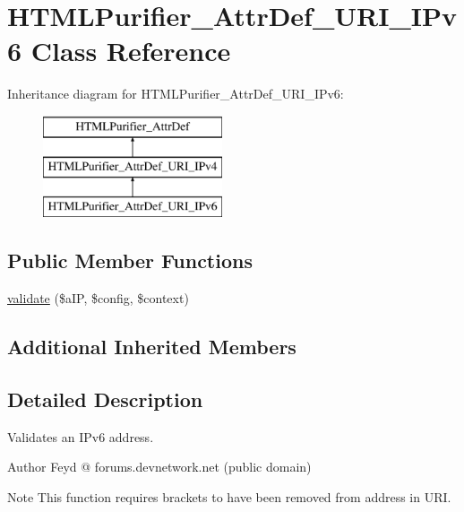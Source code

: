 \hypertarget{classHTMLPurifier__AttrDef__URI__IPv6}{\section{H\+T\+M\+L\+Purifier\+\_\+\+Attr\+Def\+\_\+\+U\+R\+I\+\_\+\+I\+Pv6 Class Reference}
\label{classHTMLPurifier__AttrDef__URI__IPv6}
}
Inheritance diagram for H\+T\+M\+L\+Purifier\+\_\+\+Attr\+Def\+\_\+\+U\+R\+I\+\_\+\+I\+Pv6\+:\begin{figure}[H]
\begin{center}
\leavevmode
\includegraphics[height=3.000000cm]{classHTMLPurifier__AttrDef__URI__IPv6}
\end{center}
\end{figure}
\subsection*{Public Member Functions}
\begin{DoxyCompactItemize}
\item 
\hyperlink{classHTMLPurifier__AttrDef__URI__IPv6_a06719a4cb80fe8c83f905f5debb22177}{validate} (\$a\+I\+P, \$config, \$context)
\end{DoxyCompactItemize}
\subsection*{Additional Inherited Members}


\subsection{Detailed Description}
Validates an I\+Pv6 address. \begin{DoxyAuthor}{Author}
Feyd @ forums.\+devnetwork.\+net (public domain) 
\end{DoxyAuthor}
\begin{DoxyNote}{Note}
This function requires brackets to have been removed from address in U\+R\+I. 
\end{DoxyNote}


